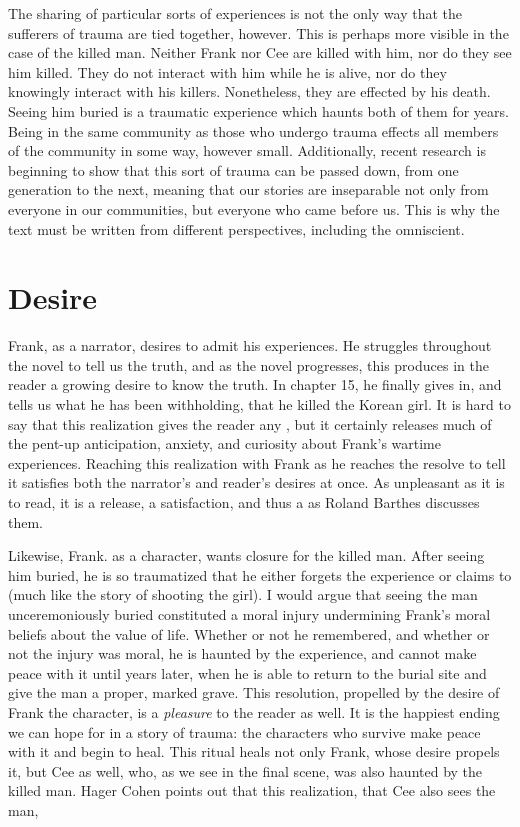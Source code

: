\documentclass[12pt]{article}
\begin{document}
The sharing of particular sorts of experiences is not the only way that the
sufferers of trauma are tied together, however. This is perhaps more visible in
the case of the killed man. Neither Frank nor Cee are killed with him, nor do
they see him killed. They do not interact with him while he is alive, nor do
they knowingly interact with his killers. Nonetheless, they are effected by his
death. Seeing him buried is a traumatic experience which haunts both of them
for years. Being in the same community as those who undergo trauma effects all
members of the community in some way, however small. Additionally, recent
research is beginning to show that this sort of trauma can be passed down, from
one generation to the next,\autocite{Dias14,Love10} meaning that our stories
are inseparable not only from everyone in our communities, but everyone who
came before us. This is why the text must be written from different
perspectives, including the omniscient.

\section{Desire}

Frank, as a narrator, desires to admit his experiences. He struggles throughout
the novel to tell us the truth, and as the novel progresses, this produces in
the reader a growing desire to know the truth. In chapter
15,\autocite[p.~133]{Morrison12} he finally gives in, and tells us what he has
been withholding, that he killed the Korean girl. It is hard to say that this
realization gives the reader any , but it certainly releases much
of the pent-up anticipation, anxiety, and curiosity about Frank's wartime
experiences.  Reaching this realization with Frank as he reaches the resolve to
tell it satisfies both the narrator's and reader's desires at once. As
unpleasant as it is to read, it is a release, a satisfaction, and thus a
 as Roland Barthes discusses them.\autocite[p.
124]{Charon06}

Likewise, Frank. as a character, wants closure for the killed man. After seeing
him buried, he is so traumatized that he either forgets the experience or
claims to (much like the story of shooting the girl).\autocite[p.
5-6]{Morrison12} I would argue that seeing the man unceremoniously buried
constituted a moral injury undermining Frank's moral beliefs about the value of
life. Whether or not he remembered, and whether or not the injury was moral, he
is haunted by the experience, and cannot make peace with it until years later,
when he is able to return to the burial site and give the man a proper, marked
grave. This resolution, propelled by the desire of Frank the character, is a
\emph{pleasure} to the reader as well. It is the happiest ending we can hope
for in a story of trauma: the characters who survive make peace with it and
begin to heal. This ritual heals not only Frank, whose desire propels it, but
Cee as well, who, as we see in the final scene, was also haunted by the killed
man. Hager Cohen points out that this realization, that Cee also sees the man,
\autocite{HagenCohen12}
\end{document}
